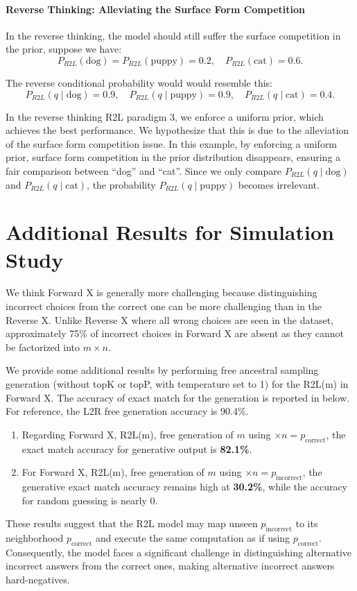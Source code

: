 \paragraph{Reverse Thinking: Alleviating the Surface Form Competition}
In the reverse thinking, the model should still suffer the surface competition in the prior, suppose we have:
\[
P_{R2L}(\text{dog}) = P_{R2L}(\text{puppy}) = 0.2, \quad P_{R2L}(\text{cat}) = 0.6.
\]

The reverse conditional probability would would resemble this:
\[
P_{R2L}(q \mid \text{dog}) = 0.9, \quad P_{R2L}(q \mid \text{puppy}) = 0.9, \quad P_{R2L}(q \mid \text{cat}) = 0.4.
\]

In the reverse thinking R2L paradigm 3, we enforce a uniform prior, which achieves the best performance. 
We hypothesize that this is due to the alleviation of the surface form competition issue. In this example, by enforcing a uniform prior, surface form competition in the prior distribution disappears, ensuring a fair comparison between ``dog'' and ``cat''.
Since we only compare $P_{R2L}(q \mid \text{dog})$ and $P_{R2L}(q \mid \text{cat})$, the probability $P_{R2L}(q \mid \text{puppy})$ becomes irrelevant.








\section{Additional Results for Simulation Study}
\label{app:simulation}
We think Forward X is generally more challenging because distinguishing incorrect choices from the correct one can be more challenging than in the Reverse X. Unlike Reverse X where all wrong choices are seen in the dataset, approximately 75\% of incorrect choices in Forward X are absent as they cannot be factorized into $m \times n$. 

We provide some additional results by performing free ancestral sampling generation (without topK or topP, with temperature set to 1) for the R2L(m) in Forward X. The accuracy of exact match for the generation is reported in below. For reference, the L2R free generation accuracy is 90.4\%.

\begin{enumerate}
    \item Regarding Forward X, R2L(m), free generation of $m$ using $\times n = p_{\text{correct}}$, the exact match accuracy for generative output is \textbf{82.1\%}.
    \item For Forward X, R2L(m), free generation of $m$  using $\times n = p_{\text{incorrect}}$, the generative exact match accuracy remains high at \textbf{30.2\%}, while the accuracy for random guessing is nearly 0. 
\end{enumerate}

These results suggest that the R2L model may map unseen $p_{\text{incorrect}}$ to its neighborhood $p_{\text{correct}}$ and execute the same computation as if using $p_{\text{correct}}$. Consequently, the model faces a significant challenge in distinguishing alternative incorrect answers from the correct ones, making alternative incorrect answers hard-negatives. 